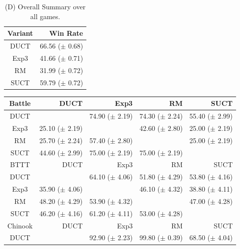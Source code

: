 \documentclass[conference]{IEEEtran}
\begin{document}
\begin{table}
\begin{center}
\begin{tabular}{|c|r|}
\hline
Variant     & Win Rate \\
\hline
      DUCT  &   66.56 ($\pm$ 0.68) \\
      Exp3  &   41.66 ($\pm$ 0.71) \\
        RM  &   31.99 ($\pm$ 0.72) \\
      SUCT  &   59.79 ($\pm$ 0.72) \\
\hline
\end{tabular}
\end{center}
\caption{(D) Overall Summary over all games.}
\end{table}

\begin{table}
\begin{center}
\begin{tabular}{|c|rrrr|}
\hline
         Battle    &       DUCT   &       Exp3   &         RM   &       SUCT   \\
\hline
           DUCT    &          & 74.90 ($\pm$ 2.19)   & 74.30 ($\pm$ 2.24)   & 55.40 ($\pm$ 2.99)   \\
           Exp3    & 25.10 ($\pm$ 2.19)   &          & 42.60 ($\pm$ 2.80)   & 25.00 ($\pm$ 2.19)   \\
             RM    & 25.70 ($\pm$ 2.24)   & 57.40 ($\pm$ 2.80)   &          & 25.00 ($\pm$ 2.19)   \\
           SUCT    & 44.60 ($\pm$ 2.99)   & 75.00 ($\pm$ 2.19)   & 75.00 ($\pm$ 2.19)   &          \\
\hline
\hline
BTTT   &       DUCT   &       Exp3   &         RM   &       SUCT   \\
\hline
           DUCT    &          & 64.10 ($\pm$ 4.06)   & 51.80 ($\pm$ 4.29)   & 53.80 ($\pm$ 4.16)   \\
           Exp3    & 35.90 ($\pm$ 4.06)   &          & 46.10 ($\pm$ 4.32)   & 38.80 ($\pm$ 4.11)   \\
             RM    & 48.20 ($\pm$ 4.29)   & 53.90 ($\pm$ 4.32)   &          & 47.00 ($\pm$ 4.28)   \\
           SUCT    & 46.20 ($\pm$ 4.16)   & 61.20 ($\pm$ 4.11)   & 53.00 ($\pm$ 4.28)   &          \\
\hline
\hline
        Chinook   &       DUCT   &       Exp3   &         RM   &       SUCT   \\
\hline
           DUCT    &          & 92.90 ($\pm$ 2.23)   & 99.80 ($\pm$ 0.39)   & 68.50 ($\pm$ 4.04)   \\

\end{tabular}
\end{center}
\end{table}
\end{document}
